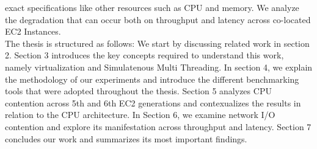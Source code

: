 exact specifications like other resources such as CPU and memory. 
We analyze the degradation that can occur both on throughput and latency across co-located EC2 Instances.\\ 
The thesis is structured as follows: We start by discussing related work in section 2. 
Section 3 introduces the key concepts required to understand this work, namely virtualization and 
Simulatenous Multi Threading. In section 4, we explain the methodology of our experiments
and introduce the different benchmarking tools that were adopted throughout the thesis. 
Section 5 analyzes CPU contention across 5th and 6th EC2 generations and contexualizes the results in 
relation to the CPU architecture. In Section 6, we examine network I/O contention and 
explore its manifestation across throughput and latency. Section 7 concludes our work and summarizes 
its most important findings. 
